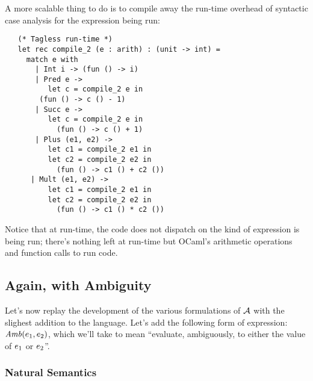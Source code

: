 A more scalable thing to do is to compile away the run-time overhead
of syntactic case analysis for the expression being run:
\begin{verbatim}
   (* Tagless run-time *)
   let rec compile_2 (e : arith) : (unit -> int) =
     match e with
       | Int i -> (fun () -> i)
       | Pred e -> 
          let c = compile_2 e in
	    (fun () -> c () - 1)
       | Succ e -> 
          let c = compile_2 e in
            (fun () -> c () + 1)
       | Plus (e1, e2) ->
          let c1 = compile_2 e1 in
          let c2 = compile_2 e2 in
            (fun () -> c1 () + c2 ())
      | Mult (e1, e2) ->
          let c1 = compile_2 e1 in
          let c2 = compile_2 e2 in
            (fun () -> c1 () * c2 ())
\end{verbatim}

Notice that at run-time, the code does not dispatch on the kind of
expression is being run; there's nothing left at run-time but OCaml's
arithmetic operations and function calls to run code.



\subsection{Again, with Ambiguity}

Let's now replay the development of the various formulations of
$\mathcal{A}$ with the slighest addition to the language.  Let's add the
following form of expression: $\mathit{Amb}(e_1,e_2)$, which we'll
take to mean ``evaluate, ambiguously, to either the value of $e_1$
or $e_2$''.

\subsubsection{Natural Semantics}

